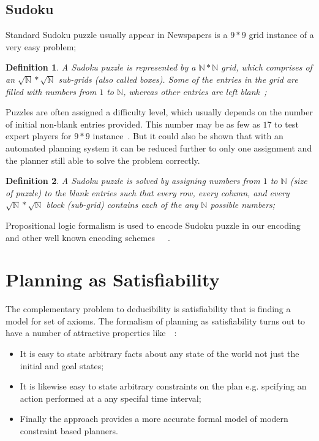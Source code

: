 \documentclass[letterpaper]{article}
\newtheorem{definition}{Definition}[section]
\begin{document}
\subsection{Sudoku}
Standard Sudoku puzzle usually appear in Newspapers is a $9\ast9$ grid instance of a very easy problem;


\begin{definition} A Sudoku puzzle is represented by a $\mathbb{N}\ast\mathbb{N}$ grid, which comprises of an $\sqrt{\mathbb{N}} \ast \sqrt{\mathbb{N}}$ sub-grids (also called boxes). 
Some of the entries in the grid are filled with numbers from $1$ to $\mathbb{N}$, whereas other entries are left blank~\cite{Lynce2006};\end{definition}

Puzzles are often assigned a difficulty level, which usually depends on the number of initial non-blank entries provided. This number may be as few as $17$ to test expert players for $9\ast9$ instance~\cite{Lynce2006}. But it could also be shown that with an automated planning system it can be reduced further to only one assignment and the planner still able to solve the problem correctly.

\begin{definition} A Sudoku puzzle is solved by assigning numbers from $1$ to $\mathbb{N}$ (size of puzzle) to the blank entries such that every row, every column, and every $\sqrt{\mathbb{N}} \ast \sqrt{\mathbb{N}}$ block (sub-grid) contains each of the any $\mathbb{N}$ possible numbers;\end{definition} 

Propositional logic formalism is used to encode Sudoku puzzle in our encoding and other well known encoding schemes~\cite{Weber2005}~\cite{Lynce2006}~\cite{Gihwon2006}.

\section{Planning as Satisfiability}
The complementary problem to deducibility is satisfiability that is finding a model for set of axioms. The formalism of planning as satisfiability turns out to have a number of  attractive properties like~\cite{Stefik1981}~\cite{Chapman1987}: 
\begin{itemize}
\item It is easy to state arbitrary facts about any state of the world not just the initial and goal states;
\item It is likewise easy to state arbitrary constraints on the plan e.g. spcifying an action performed at a any specifal time interval;
\item Finally the approach provides a more accurate formal model of modern constraint based planners.
\end{itemize}
\end{document}

